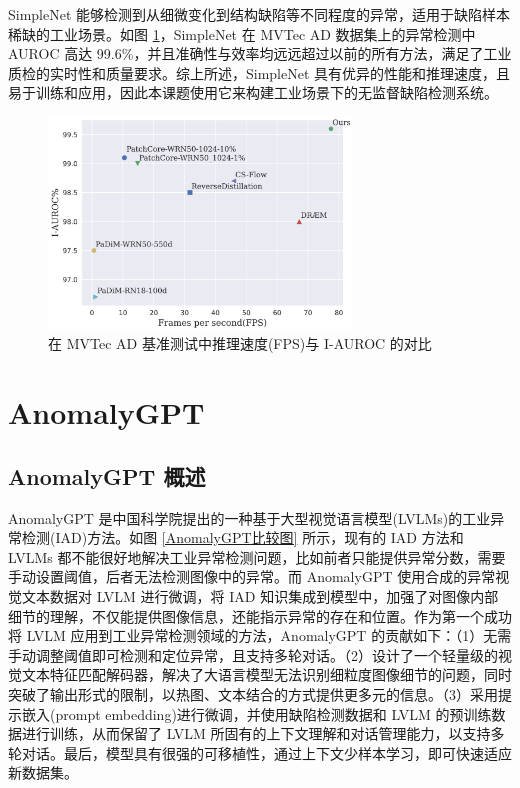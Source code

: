 \documentclass[
  ]{njuthesis}
\begin{document}
SimpleNet 能够检测到从细微变化到结构缺陷等不同程度的异常，适用于缺陷样本稀缺的工业场景。如图 \ref{MVTec基准测试结果}，SimpleNet 在 MVTec AD 数据集上的异常检测中 AUROC 高达 99.6\%，并且准确性与效率均远远超过以前的所有方法，满足了工业质检的实时性和质量要求。综上所述，SimpleNet 具有优异的性能和推理速度，且易于训练和应用，因此本课题使用它来构建工业场景下的无监督缺陷检测系统。

\begin{figure}[ht]
    \centering
    \includegraphics[width=0.72\textwidth]{images/MVTec基准测试结果.png}
    \caption{在 MVTec AD 基准测试中推理速度(FPS)与 I-AUROC 的对比}
    \label{MVTec基准测试结果}
\end{figure}

\section{AnomalyGPT}

\subsection{AnomalyGPT 概述}

AnomalyGPT\cite{[10]} 是中国科学院提出的一种基于大型视觉语言模型(LVLMs)的工业异常检测(IAD)方法。如图 \ref{AnomalyGPT比较图} 所示，现有的 IAD 方法和 LVLMs 都不能很好地解决工业异常检测问题，比如前者只能提供异常分数，需要手动设置阈值，后者无法检测图像中的异常。而 AnomalyGPT 使用合成的异常视觉文本数据对 LVLM 进行微调，将 IAD 知识集成到模型中，加强了对图像内部细节的理解，不仅能提供图像信息，还能指示异常的存在和位置。作为第一个成功将 LVLM 应用到工业异常检测领域的方法，AnomalyGPT 的贡献如下：（1）无需手动调整阈值即可检测和定位异常，且支持多轮对话。（2）设计了一个轻量级的视觉文本特征匹配解码器，解决了大语言模型无法识别细粒度图像细节的问题，同时突破了输出形式的限制，以热图、文本结合的方式提供更多元的信息。（3）采用提示嵌入(prompt embedding)进行微调，并使用缺陷检测数据和 LVLM 的预训练数据进行训练，从而保留了 LVLM 所固有的上下文理解和对话管理能力，以支持多轮对话。最后，模型具有很强的可移植性，通过上下文少样本学习，即可快速适应新数据集。
\end{document}
